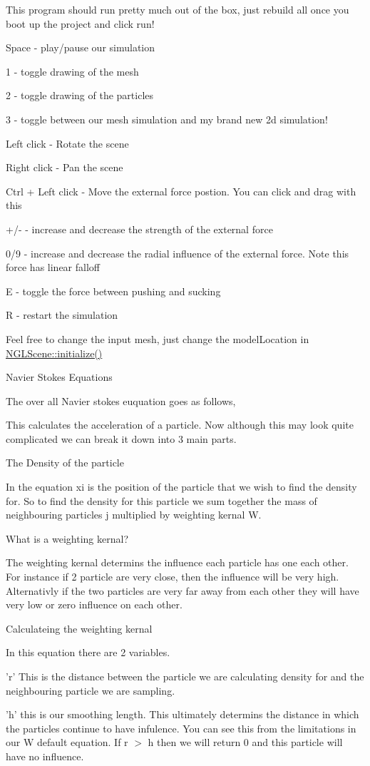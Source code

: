   This program should run pretty much out of the box, just rebuild all once you boot up the project and click run!\par
  Space -\/ play/pause our simulation \par
 1 -\/ toggle drawing of the mesh \par
 2 -\/ toggle drawing of the particles \par
 3 -\/ toggle between our mesh simulation and my brand new 2d simulation! \par
 Left click -\/ Rotate the scene \par
 Right click -\/ Pan the scene\par
 Ctrl + Left click -\/ Move the external force postion. You can click and drag with this\par
 +/-\/ -\/ increase and decrease the strength of the external force\par
 0/9 -\/ increase and decrease the radial influence of the external force. Note this force has linear falloff\par
 E -\/ toggle the force between pushing and sucking\par
 R -\/ restart the simulation\par
 Feel free to change the input mesh, just change the model\-Location in \hyperlink{classNGLScene_a63e57fc201b639e51c6eed6ec3b6b992}{N\-G\-L\-Scene\-::initialize()}\par
  Navier Stokes Equations\par
 The over all Navier stokes euquation goes as follows,\par
  This calculates the acceleration of a particle. Now although this may look quite complicated we can break it down into 3 main parts.\par
 \par
 The Density of the particle\par
  In the equation xi is the position of the particle that we wish to find the density for. So to find the density for this particle we sum together the mass of neighbouring particles j multiplied by weighting kernal W.\par
 What is a weighting kernal?\par
 The weighting kernal determins the influence each particle has one each other. For instance if 2 particle are very close, then the influence will be very high. Alternativly if the two particles are very far away from each other they will have very low or zero influence on each other.\par
 \par
 Calculateing the weighting kernal\par
  In this equation there are 2 variables.\par
 'r' This is the distance between the particle we are calculating density for and the neighbouring particle we are sampling.\par
 'h' this is our smoothing length. This ultimately determins the distance in which the particles continue to have infulence. You can see this from the limitations in our W default equation. If r $>$ h then we will return 0 and this particle will have no influence.

